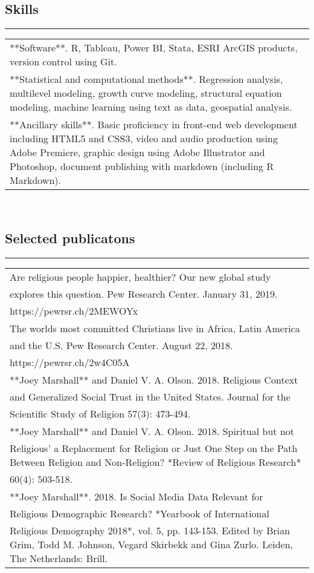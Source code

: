 \documentclass[]{article}
\begin{document}
\subsection{Skills}\label{skills}

\begin{center}\rule{0.5\linewidth}{\linethickness}\end{center}

\begin{tabular}{l}
\hline
\\
\hline
**Software**. R, Tableau, Power  BI, Stata, ESRI ArcGIS products, version control using Git.\\
\hline
**Statistical and computational methods**. Regression analysis, multilevel modeling, growth curve modeling, structural equation modeling, machine learning using text as data, geospatial analysis.\\
\hline
**Ancillary skills**. Basic proficiency in front-end web development including HTML5 and CSS3, video and audio production using Adobe Premiere, graphic design using Adobe Illustrator and Photoshop, document publishing with markdown (including R Markdown).\\
\hline
\end{tabular}

~

\subsection{Selected publicatons}\label{selected-publicatons}

\begin{center}\rule{0.5\linewidth}{\linethickness}\end{center}

\begin{tabular}{l}
\hline
\\
\hline
Are religious people happier, healthier? Our new global study explores this question. Pew Research Center. January 31, 2019. https://pewrsr.ch/2MEWOYx\\
\hline
The worlds most committed Christians live in Africa, Latin America  and the U.S. Pew Research Center. August 22, 2018. https://pewrsr.ch/2w4C05A\\
\hline
**Joey Marshall** and Daniel V. A. Olson. 2018. Religious Context and Generalized Social Trust in the United States. Journal for the Scientific Study of Religion 57(3): 473-494.\\
\hline
**Joey Marshall** and Daniel V. A. Olson. 2018. Spiritual but not Religious' a Replacement for Religion or Just One Step on the Path Between Religion and Non-Religion? *Review of Religious Research* 60(4): 503-518.\\
\hline
**Joey Marshall**. 2018. Is Social Media Data Relevant for Religious Demographic Research? *Yearbook of International Religious Demography 2018*, vol. 5, pp. 143-153. Edited by Brian Grim, Todd M. Johnson, Vegard Skirbekk and Gina Zurlo. Leiden, The Netherlands: Brill.\\
\hline
\end{tabular}
\end{document}
